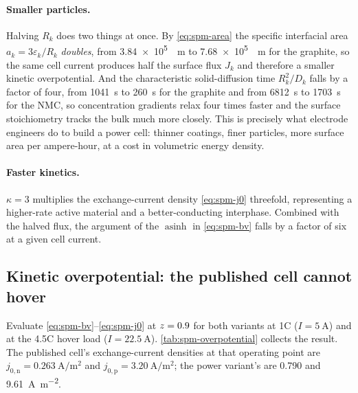 \paragraph{Smaller particles.} Halving $R_k$ does two things at once. By \eqref{eq:spm-area} the
specific interfacial area $a_k = 3\varepsilon_k/R_k$ \emph{doubles}, from \SI{3.84e5}{\per\metre}
to \SI{7.68e5}{\per\metre} for the graphite, so the same cell current produces half the surface
flux $J_k$ and therefore a smaller kinetic overpotential. And the characteristic solid-diffusion
time $R_k^2/D_k$ falls by a factor of four, from \SI{1041}{\second} to \SI{260}{\second} for the
graphite and from \SI{6812}{\second} to \SI{1703}{\second} for the NMC, so concentration
gradients relax four times faster and the surface stoichiometry tracks the bulk much more
closely. This is precisely what electrode engineers do to build a power cell: thinner coatings,
finer particles, more surface area per ampere-hour, at a cost in volumetric energy density.

\paragraph{Faster kinetics.} $\kappa = 3$ multiplies the exchange-current density
\eqref{eq:spm-j0} threefold, representing a higher-rate active material and a better-conducting
interphase. Combined with the halved flux, the argument of the $\operatorname{asinh}$ in
\eqref{eq:spm-bv} falls by a factor of six at a given cell current.

\subsection{Kinetic overpotential: the published cell cannot hover}
\label{sec:spm-overpotential}
Evaluate \eqref{eq:spm-bv}--\eqref{eq:spm-j0} at $z = 0.9$ for both variants at 1C
($I=\SI{5}{\ampere}$) and at the 4.5C hover load ($I=\SI{22.5}{\ampere}$).
\cref{tab:spm-overpotential} collects the result. The published cell's exchange-current densities
at that operating point are $j_{0,\mathrm{n}} = \SI{0.263}{\ampere\per\square\metre}$ and
$j_{0,\mathrm{p}} = \SI{3.20}{\ampere\per\square\metre}$; the power variant's are
\SI{0.790}{} and \SI{9.61}{\ampere\per\square\metre}.

